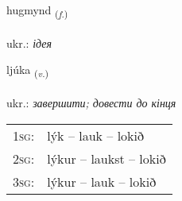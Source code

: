 \documentclass[frontgrid, backgrid]{flacards}\usepackage[]{graphicx}\usepackage[]{xcolor}
\begin{document}
\renewcommand{\blhead}{\vskip5pt {\small\bfseries\footnotesize Nafnorð | іменник }}
\renewcommand{\bcfoot}{\vskip5pt \hspace{2pt}{\small\bfseries\footnotesize 1K}}


{hugmynd \small{\textsubscript{(\textit{f.})}} \\[1ex] %
\textphonetic{[hʏɣmɪnt]} \\
ukr.: \emph{ідея} \\  [2ex]
\renewcommand*{\arraystretch}{0.8}
}

\renewcommand{\flhead}{\vskip5pt \fboxsep=0pt {\small\bfseries\footnotesize Sagnorð | дієслово}}
\renewcommand{\fcfoot}{\vskip5pt \fboxsep=0pt \hspace{2pt}{\small\bfseries\footnotesize 1K}}

\renewcommand{\blhead}{\vskip5pt {\small\bfseries\footnotesize Sagnorð | дієслово }}
\renewcommand{\bcfoot}{\vskip5pt \hspace{2pt}{\small\bfseries\footnotesize 1K}}


{ljúka \small{\textsubscript{(\textit{v.})}} \\[1ex] %
\textphonetic{[ljuːka]} \\
ukr.: \emph{завершити; довести до кінця} \\  [2ex]
\renewcommand*{\arraystretch}{0.8}
\begin{tabular}{p{1cm}l}
\textsc{1sg}: & lýk -- lauk -- lokið \\ 
\textsc{2sg}: & lýkur -- laukst -- lokið \\ 
\textsc{3sg}: & lýkur -- lauk -- lokið \\ 
\end{tabular}
}

\renewcommand{\flhead}{\vskip5pt \fboxsep=0pt {\small\bfseries\footnotesize Nafnorð | іменник}}
\renewcommand{\fcfoot}{\vskip5pt \fboxsep=0pt \hspace{2pt}{\small\bfseries\footnotesize 1K}}
\end{document}
